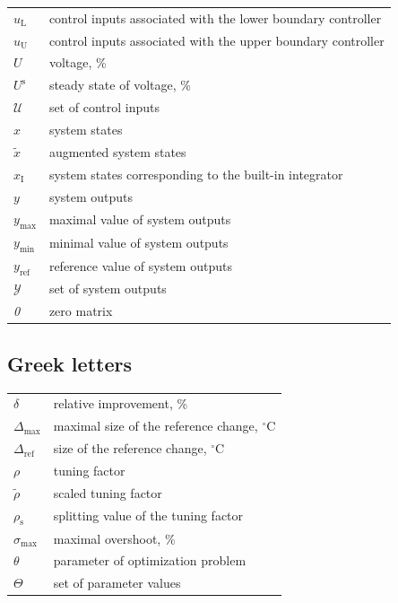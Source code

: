 \documentclass[preprint,12pt]{elsarticle}
\begin{document}
	
		\begin{tabular}{ l l }
			$u_{\mathrm{L}}$ & control inputs associated with the lower boundary controller\\
			$u_{\mathrm{U}}$ & control inputs associated with the upper boundary controller\\
			$U$ & voltage, \% \\
			$U^{\mathrm{s}}$ & steady state of voltage, \% \\
			$\mathcal{U}$ & set of control inputs \\			
			$x$ & system states \\
			$\widetilde{x}$ & augmented system states \\
			$x_{\mathrm{I}}$ & system states corresponding to the built-in integrator \\
			$y$ & system outputs \\
			$y_\mathrm{\max}$ & maximal value of system outputs \\
			$y_\mathrm{\min}$ & minimal value of system outputs \\
			$y_\mathrm{ref}$ & reference value of system outputs \\
			$\mathcal{Y}$ & set of system outputs \\
			\textit{0} & zero matrix
		\end{tabular}
	
	\subsection{Greek letters}
		\begin{tabular}{ l l }
			$\delta$ & relative improvement, \% \\
			$\Delta_\mathrm{max}$ & maximal size of the reference change, $^{\circ}\mathrm{C}$  \\
			$\Delta_\mathrm{ref}$ & size of the reference change, $^{\circ}\mathrm{C}$ \\
			$\rho$ & tuning factor \\
			$\widetilde{\rho}$ & scaled tuning factor \\
			$\rho_{\mathrm{s}}$ & splitting value of the tuning factor \\
			$\sigma_{\max}$ & maximal overshoot, \% \\
			$\theta$ & parameter of optimization problem \\
			$\Theta$ & set of parameter values
		\end{tabular}
	
\end{document}
